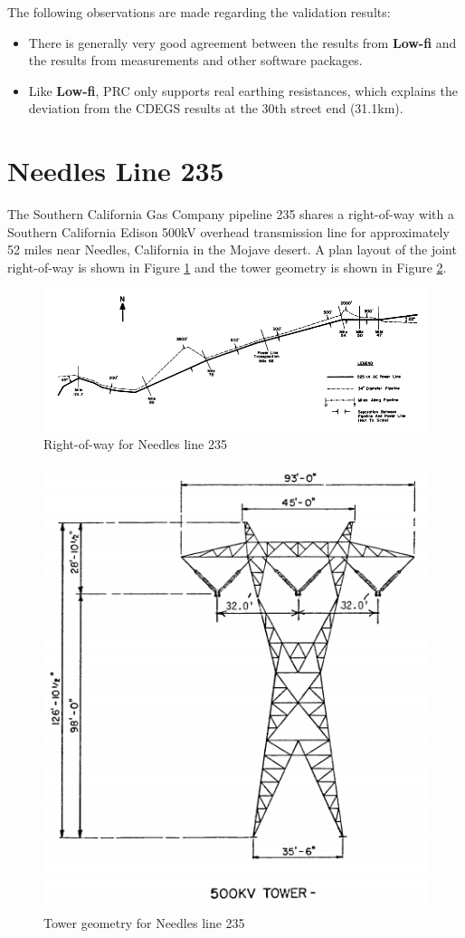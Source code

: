\documentclass{article}
\begin{document}
The following observations are made regarding the validation results:
\begin{itemize}
\item There is generally very good agreement between the results from \textbf{Low-fi} and the results from measurements and other software packages.
\item Like \textbf{Low-fi}, PRC only supports real earthing resistances, which explains the deviation from the CDEGS results at the 30th street end (31.1km). 
\end{itemize}

\newpage
\section{Needles Line 235}
The Southern California Gas Company pipeline 235 shares a right-of-way with a Southern California Edison 500kV overhead transmission line for approximately 52 miles near Needles, California in the Mojave desert. A plan layout of the joint right-of-way is shown in Figure \ref{fig:needles_row} and the tower geometry is shown in Figure \ref{fig:needles_geo}. 

\begin{figure}[!htp]
\begin{center}
\caption{Right-of-way for Needles line 235 \cite{taflove_1979}}
\label{fig:needles_row}
\includegraphics[width=\linewidth]{./Figures/needles_row.png}
\end{center}
\end{figure}

\begin{figure}[!htp]
\begin{center}
\caption{Tower geometry for Needles line 235 \cite{taflove_1979}}
\label{fig:needles_geo}
\includegraphics[width=0.4\linewidth]{./Figures/needles_geo.png}
\end{center}
\end{figure}
\end{document}
